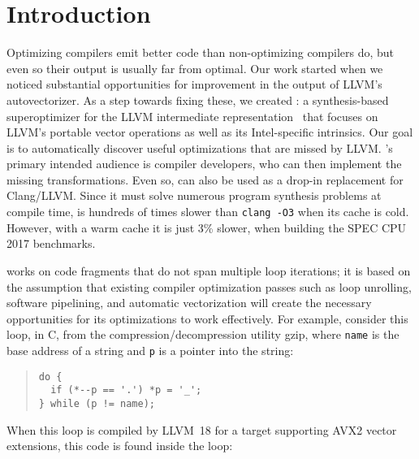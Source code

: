 \section{Introduction}

Optimizing compilers emit better code than non-optimizing compilers
do, but even so their output is usually far from optimal.
%
Our work started when we noticed substantial opportunities for
improvement in the output of LLVM's autovectorizer.
%
As a step towards fixing these, we created \minotaur{}: a synthesis-based
superoptimizer for the LLVM intermediate
representation~\cite{LLVM:CGO04} that focuses on LLVM's portable
vector operations as well as its Intel-specific intrinsics.
%
Our goal is to automatically discover useful optimizations that are
missed by LLVM\@.
%
\minotaur's primary intended audience is compiler developers, who can then
implement the missing transformations.
%
Even so, \minotaur{} can also be used as a drop-in replacement for
Clang/LLVM\@.
%
Since it must solve numerous program synthesis problems at compile
time, \minotaur{} is hundreds of times slower than \texttt{clang -O3}
when its cache is cold.
%
However, with a warm cache it is just 3\% slower, when building the
SPEC CPU 2017 benchmarks.


\minotaur{} works on code fragments that do not span multiple loop
iterations; it is based on the assumption that existing compiler
optimization passes such as loop unrolling, software pipelining, and
automatic vectorization will create the necessary opportunities for
its optimizations to work effectively.
%
For example, consider this loop, in C, from the
compression/decompression utility gzip, where \texttt{name} is the
base address of a string and \texttt{p} is a pointer into the string:

\iffalse
\begin{verbatim}
void make_simple_name(char *name) {
  char *p = strrchr(name, '.');
  if (p == NULL) return;
  if (p == name) p++;
  do {
      if (*--p == '.') *p = '_';
  } while (p != name);
}
\end{verbatim}
\fi

{\begin{quote}
\begin{verbatim}
do {
  if (*--p == '.') *p = '_';
} while (p != name);
\end{verbatim}
\end{quote}}

When this loop is compiled by LLVM~18 for a target supporting AVX2
vector extensions, this code is found inside the loop:

